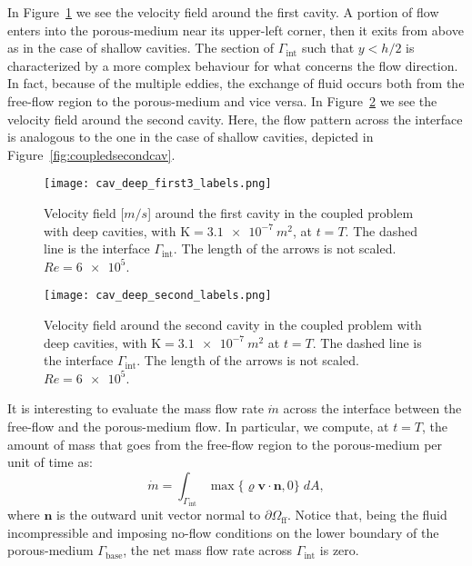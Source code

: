 In Figure~\ref{fig:coupled_first_deep} we see the velocity field around the first cavity. A portion of flow enters into the porous-medium near its upper-left corner, then it exits from above as in the case of shallow cavities.
The section of $\Gamma_\text{int}$ such that $y<h/2$ is characterized by a more complex behaviour for what concerns the flow direction. In fact, because of the multiple eddies, the exchange of fluid occurs both from the free-flow region to the porous-medium and vice versa.
In Figure~\ref{fig:coupledsecondcav_deep} we see the velocity field around the second cavity. Here, the flow pattern across the interface is analogous to the one in the case of shallow cavities, depicted in Figure~\ref{fig:coupledsecondcav}.
\begin{figure}
	\centering
	\texttt{[image: cav\_deep\_first3\_labels.png]}
	\caption[Velocity field around the first cavity in the coupled problem with deep cavities]{Velocity field [$\si{m/s}$] around the first cavity in the coupled problem with deep cavities, with $\mathrm{K}=\SI{3.1e-7}{m^2}$, at $t=T$. The dashed line is the interface $\Gamma_\text{int}$. The length of the arrows is not scaled. $Re=\num{6e5}$.}
	\label{fig:coupled_first_deep}
\end{figure}
\begin{figure}
	\centering
	\texttt{[image: cav\_deep\_second\_labels.png]}
	\caption[Velocity field around the second cavity in the coupled problem with deep cavities]{Velocity field around the second cavity in the coupled problem with deep cavities, with $\mathrm{K}=\SI{3.1e-7}{m^2}$ at $t=T$. The dashed line is the interface $\Gamma_\text{int}$. The length of the arrows is not scaled. $Re=\num{6e5}$.}
	\label{fig:coupledsecondcav_deep}
\end{figure}

It is interesting to evaluate the mass flow rate $\dot{m}$ across the interface between the free-flow and the porous-medium flow. In particular, we compute, at $t=T$, the amount of mass that goes from the free-flow region to the porous-medium per unit of time as:
\begin{equation}
\dot{m} = \int_{\Gamma_\text{int}} \max \{\varrho \mathbf{v} \cdot \mathbf{n}, 0 \} \; dA,
\end{equation}
where $\mathbf{n}$ is the outward unit vector normal to $\partial \Omega_\text{ff}$. Notice that, being the fluid incompressible and imposing no-flow conditions on the lower boundary of the porous-medium $\Gamma_\text{base}$, the net mass flow rate across $\Gamma_\text{int}$ is zero.

